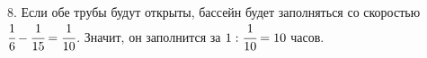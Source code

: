 8. Если обе трубы будут открыты, бассейн будет заполняться со скоростью $\cfrac{1}{6}-\cfrac{1}{15}=\cfrac{1}{10}$. Значит, он заполнится за $1:\cfrac{1}{10}=10$ часов.\\
